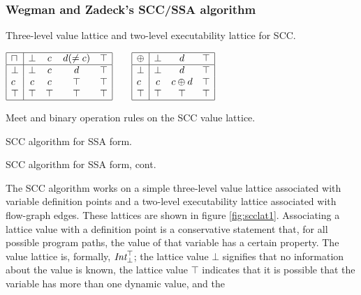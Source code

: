 \documentclass[12pt,titlepage,twoside]{article}
\newcommand*{\figscale}{1.0}
\newcommand{\meet}{\ensuremath{\sqcap}}
\begin{document}
\subsubsection{Wegman and Zadeck's SCC/SSA algorithm}
\begin{myfigure}
\centering\renewcommand*{\figscale}{0.5}
\caption{Three-level value lattice and two-level executability lattice for SCC.}
\label{fig:scclat1}
\end{myfigure}
\begin{mytable}\centering
$\begin{array}{|l|cccc|} \hline
\meet & \bot & c & d (\not= c) & \top \\ \hline
\bot  & \bot & c & d  & \top \\
c     &   c  & c &\top & \top \\
\top  & \top &\top&\top& \top \\ \hline
\end{array}%
\quad\quad%
\begin{array}{|l|ccc|}\hline
\oplus& \bot &   d  & \top \\ \hline
\bot  & \bot &   d  & \top \\
c     &   c  &c\oplus d& \top \\
\top  & \top & \top & \top \\ \hline
\end{array}$
\caption{Meet and binary operation rules on the SCC value lattice.}
\label{tab:sccmeet1}
\end{mytable}
\begin{myalgorithm}\small

\caption{SCC algorithm for SSA form.}\label{alg:scc}
\end{myalgorithm}
\begin{myalgorithm}\small

\caption{SCC algorithm for SSA form, cont.}\label{alg:scc2}
\end{myalgorithm}
The SCC algorithm works on a simple three-level value lattice
associated with variable definition points and a two-level
executability lattice associated with flow-graph edges.  These
lattices are shown in figure \vref{fig:scclat1}.  Associating a lattice
value with a definition point is a conservative statement that, for
all possible program paths, the value of that variable has a certain
property.  The value lattice is, formally, ${\mbox{\em Int}}_\bot^\top$;
the lattice value $\bot$ signifies that no information
about the value is known, the lattice value $\top$ indicates that it
is possible that the variable has more than one dynamic value, and the
\end{document}
